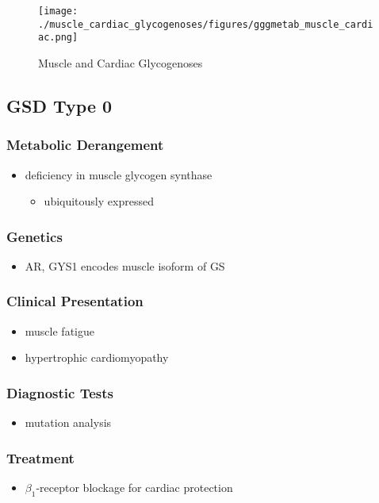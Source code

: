 \documentclass{scrartcl}
\begin{document}
\begin{figure}[htbp]
\centering
\texttt{[image: ./muscle\_cardiac\_glycogenoses/figures/gggmetab\_muscle\_cardiac.png]}
\caption[Muscle and Cardiac Glycogenoses]{\label{fig:orgb1ffc9e}
Muscle and Cardiac Glycogenoses}
\end{figure}

\subsection{GSD Type 0}
\label{sec:org8e47682}
\subsubsection{Metabolic Derangement}
\label{sec:org35e21d0}
\begin{itemize}
\item deficiency in muscle glycogen synthase
\begin{itemize}
\item ubiquitously expressed
\end{itemize}
\end{itemize}
\subsubsection{Genetics}
\label{sec:orge793a39}
\begin{itemize}
\item AR, GYS1 encodes muscle isoform of GS
\end{itemize}
\subsubsection{Clinical Presentation}
\label{sec:org5ac2d9f}
\begin{itemize}
\item muscle fatigue
\item hypertrophic cardiomyopathy
\end{itemize}
\subsubsection{Diagnostic Tests}
\label{sec:orgfee17f8}
\begin{itemize}
\item mutation analysis
\end{itemize}
\subsubsection{Treatment}
\label{sec:org41f5279}
\begin{itemize}
\item \(\beta_{\text{1}}\)-receptor blockage for cardiac protection
\end{itemize}
\end{document}
